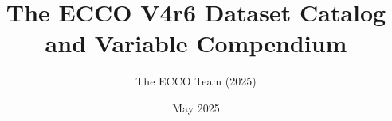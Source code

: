 \pagestyle{myfancy}

\title{The ECCO V4r6 Dataset Catalog and Variable Compendium}
\author{The ECCO Team (2025)}
\date {May 2025}

\renewcommand{\headrulewidth}{0pt}


\setlength{\headheight}{20.98703pt}
\addtolength{\topmargin}{-8.98703pt}

\renewcommand{\cellalign}{tl}

